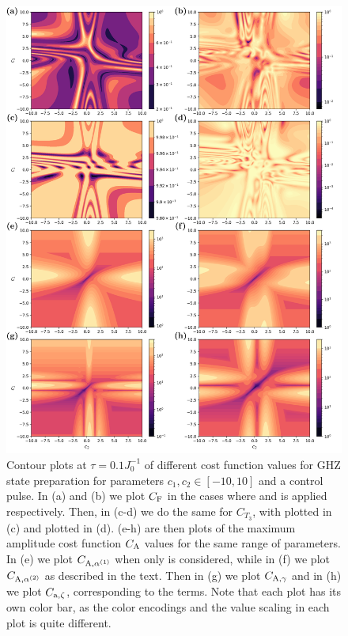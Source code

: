 \begin{figure}[t!]
    \centering
    \includegraphics[width=0.8\linewidth]{images/ghz_contour_maximums.png} \caption[Contour plots of cost function landscapes for GHZ state preparation in frustrated spin systems (maximum amplitude cost function).]{Contour plots at $\tau = 0.1 J_0^{-1}$ of different cost function values for GHZ state preparation for parameters $c_1, c_2 \in [-10,10]$ and a  control pulse. In (a) and (b) we plot $C_{\rm F}$ in the cases where  and   is applied respectively. Then, in (c-d) we do the same for $C_{T_3}$, with   plotted in (c) and   plotted in (d). (e-h) are then plots of the maximum amplitude cost function $C_{\rm A}$ values for the same range of parameters. In (e) we plot $C_{\rm A, \alpha^{(1)}}$ when only   is considered, while in (f) we plot $C_{\rm A, \alpha^{(2)}}$ as described in the text. Then in (g) we plot $C_{\rm A, \gamma}$ and in (h) we plot $C_{\rm a, \zeta}$, corresponding to the  terms. Note that each plot has its own color bar, as the color encodings and the value scaling in each plot is quite different.} \label{fig:ghz_contours_max_appendix}
\end{figure}

